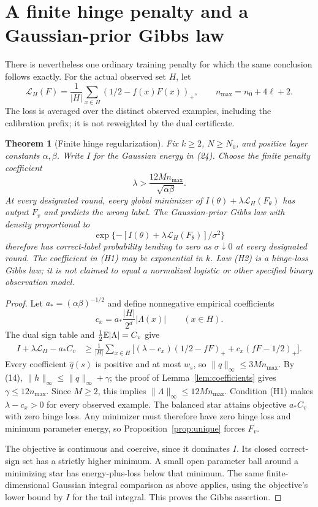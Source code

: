 \documentclass[11pt]{article}
\newtheorem{theorem}{Theorem}\newtheorem{lemma}[theorem]{Lemma}
\begin{document}
\section{A finite hinge penalty and a Gaussian-prior Gibbs law}
There is nevertheless one ordinary training penalty for which the
same conclusion follows exactly. For the actual observed set $H$, let
\[
 \mathcal L_H(F)=\frac1{|H|}\sum_{x\in H}
                        (1/2-f(x)F(x))_+,
 \qquad n_{\max}=n_0+4\ell+2.
\]
The loss is averaged over the distinct observed examples, including
the calibration prefix; it is not reweighted by the dual certificate.

\begin{theorem}[Finite hinge regularization]\label{thm:hinge}
Fix $k\ge2$, $N\ge N_0$, and positive layer constants
$\alpha,\beta$. Write $I$ for the Gaussian energy in (24).
Choose the finite penalty coefficient
\[
                  \lambda>\frac{12M n_{\max}}{\sqrt{\alpha\beta}}.
                                                               \tag{H1}
\]
At every designated round, every global minimizer of
$I(\theta)+\lambda\mathcal L_H(F_\theta)$ has output $F_v$ and
predicts the wrong label. The Gaussian-prior Gibbs law with density
proportional to
\[
       \exp\{-[I(\theta)+\lambda\mathcal L_H(F_\theta)]/\sigma^2\}
                                                               \tag{H2}
\]
therefore has correct-label probability tending to zero as
$\sigma\downarrow0$ at every designated round.
The coefficient in (H1) may be exponential in $k$. Law (H2) is a
hinge-loss Gibbs law; it is not claimed to equal a normalized logistic
or other specified binary observation model.
\end{theorem}
\begin{proof}
Let $a_*=(\alpha\beta)^{-1/2}$ and define nonnegative empirical
coefficients
\[
 c_x=a_*\frac{|H|}{2^d}|\Lambda(x)|\qquad(x\in H).
\]
The dual sign table and $\frac12\mathbb E|\Lambda|=C_v$ give
\begin{align*}
 I+\lambda\mathcal L_H-a_*C_v
 &\ge \frac1{|H|}\sum_{x\in H}
 \bigl[(\lambda-c_x)(1/2-fF)_+
                         +c_x(fF-1/2)_+\bigr].
\end{align*}
Every coefficient $\widehat q(s)$ is positive and at most $w_s$,
so $\|q\|_\infty\le3M n_{\max}$.
By (14), $\|h\|_\infty\le\|q\|_\infty+\gamma$;
the proof of Lemma~\ref{lem:coefficients} gives
$\gamma\le12n_{\max}$.
Since $M\ge2$, this implies
$\|\Lambda\|_\infty\le12M n_{\max}$.
Condition (H1) makes $\lambda-c_x>0$ for every observed example.
The balanced star attains objective $a_*C_v$ with zero hinge loss.
Any minimizer must therefore have zero hinge loss and minimum
parameter energy, so Proposition~\ref{prop:unique} forces $F_v$.

The objective is continuous and coercive, since it dominates $I$.
Its closed correct-sign set has a strictly higher minimum.
A small open parameter ball around a minimizing star has energy-plus-loss
below that minimum. The same finite-dimensional Gaussian integral
comparison as above applies, using the objective's lower bound by $I$
for the tail integral. This proves the Gibbs assertion.
\end{proof}
\end{document}
